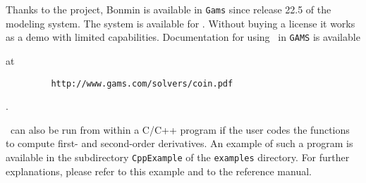 Thanks to the  project, 
Bonmin is available in {\tt Gams} since release 22.5 of the  modeling system. 
The system is available for . Without buying a license it works as a demo with limited capabilities. Documentation for using \Bonmin\ in {\tt GAMS} is available
\begin{latexonly} at
\begin{verbatim}
         http://www.gams.com/solvers/coin.pdf
\end{verbatim}
\end{latexonly}
\begin{htmlonly} . \end{htmlonly}


\Bonmin\ can also be run from within a C/C++ program if the user codes
the functions to compute first- and second-order derivatives.
An example of such a program is available in the subdirectory {\tt CppExample} of
the {\tt examples} directory. For further explanations, please refer to this example and to the reference manual.
